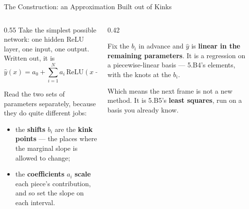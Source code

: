 \begin{frame}{The Construction: an Approximation Built out of Kinks}
\begin{columns}[T]
\begin{column}{0.55\textwidth}
\small
Take the simplest possible network: one hidden ReLU layer, one input, one output. Written out, it is
\[
  \hat y(x)=a_0+\sum_{i=1}^{N}a_i\,\mathrm{ReLU}(x-b_i).
\]
\medskip

Read the two sets of parameters separately, because they do quite different jobs:
\begin{itemize}\small\setlength{\itemsep}{1.2mm}
  \item the \textbf{shifts} $b_i$ are the \textbf{kink points} --- the places where the marginal slope is allowed to change;
  \item the \textbf{coefficients} $a_i$ \textbf{scale} each piece's contribution, and so set the slope on each interval.
\end{itemize}
\end{column}
\begin{column}{0.42\textwidth}
\begin{takeawaybox}[title=\textbf{You have seen this basis}]\small
Fix the $b_i$ in advance and $\hat y$ is \textbf{linear in the remaining parameters}. It is a regression on a piecewise-linear basis --- 5.B4's elements, with the knots at the $b_i$.
\end{takeawaybox}
\medskip
\begin{examplebox}\footnotesize
Which means the next frame is not a new method. It is 5.B5's \textbf{least squares}, run on a basis you already know.
\end{examplebox}
\end{column}
\end{columns}
\end{frame}

